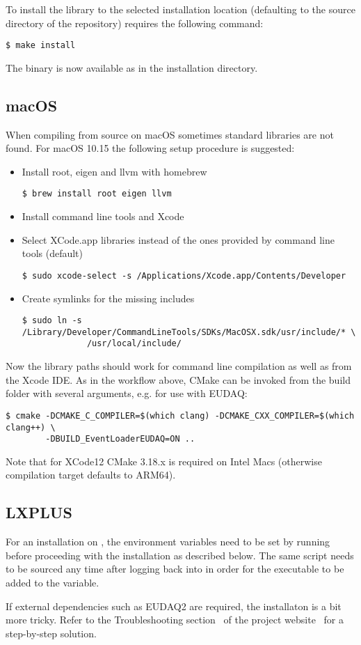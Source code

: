 To install the library to the selected installation location (defaulting to the source directory of the repository) requires the following command:
\begin{verbatim}
$ make install
\end{verbatim}

The binary is now available as  in the installation directory.

\subsection{macOS}
When compiling from source on macOS sometimes standard libraries are not found. For macOS 10.15 the following setup procedure is suggested:
\begin{itemize}
\item Install root, eigen and llvm with homebrew
\begin{verbatim}
$ brew install root eigen llvm
\end{verbatim}
\item Install command line tools and Xcode
\item Select XCode.app libraries instead of the ones provided by command line tools (default)
\begin{verbatim}
$ sudo xcode-select -s /Applications/Xcode.app/Contents/Developer
\end{verbatim}
\item Create symlinks for the missing includes
\begin{verbatim}
$ sudo ln -s /Library/Developer/CommandLineTools/SDKs/MacOSX.sdk/usr/include/* \
             /usr/local/include/
\end{verbatim}
\end{itemize}
Now the library paths should work for command line compilation as well as from the Xcode IDE. As in the workflow above, CMake can be invoked from the build folder with several arguments, e.g. for use with EUDAQ:
\begin{verbatim}
$ cmake -DCMAKE_C_COMPILER=$(which clang) -DCMAKE_CXX_COMPILER=$(which clang++) \
        -DBUILD_EventLoaderEUDAQ=ON ..
\end{verbatim}
Note that for XCode12 CMake 3.18.x is required on Intel Macs (otherwise compilation target defaults to ARM64).

\subsection{LXPLUS}
For an installation on , the environment variables need to be set by running  before proceeding with the installation as described below.
The same script needs to be sourced any time after logging back into  in order for the  executable to be added to the  variable.

If external dependencies such as EUDAQ2 are required, the installaton is a bit more tricky.
Refer to the Troubleshooting section~\cite{corry-website-troubleshooting} of the project website~\cite{corry-website} for a step-by-step solution.
